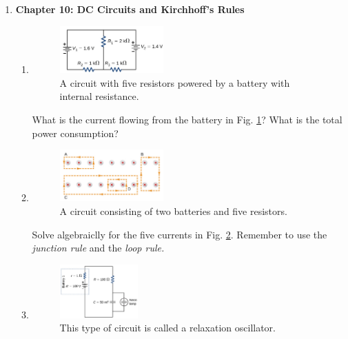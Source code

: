 \documentclass[10pt]{article}
\begin{document}
\maketitle

\begin{enumerate}
\item \textbf{Chapter 10: DC Circuits and Kirchhoff's Rules}
\begin{enumerate}
\item 
\begin{figure}[ht]
\centering
\includegraphics[width=0.4\textwidth]{circuit1.png}
\caption{\label{fig:circuit1} A circuit with five resistors powered by a battery with internal resistance.}
\end{figure}
What is the current flowing from the battery in Fig. \ref{fig:circuit1}?  What is the total power consumption? \\ \vspace{4cm}
\item 
\begin{figure}[ht]
\centering
\includegraphics[width=0.4\textwidth]{circuit2.png}
\caption{\label{fig:circuit2} A circuit consisting of two batteries and five resistors.}
\end{figure}
Solve algebraiclly for the five currents in Fig. \ref{fig:circuit2}.  Remember to use the \textit{junction rule} and the \textit{loop rule.} \\ \vspace{4cm}
\item 
\begin{figure}[ht]
\centering
\includegraphics[width=0.3\textwidth]{circuit3.png}
\caption{\label{fig:circuit3} This type of circuit is called a relaxation oscillator.}

\end{figure}
\end{enumerate}
\end{enumerate}
\end{document}
